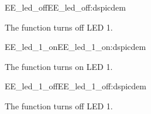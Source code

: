 \begin{function_nopb2}{EE\_led\_off}{EE_led_off:dspicdem}
  
  \begin{fundescription}
    The function turns off LED 1.
  \end{fundescription}
  
  
  
\end{function_nopb2}

\begin{function_nopb2}{EE\_led\_1\_on}{EE_led_1_on:dspicdem}
  
  \begin{fundescription}
    The function turns on LED 1.
  \end{fundescription}
  
  
  
\end{function_nopb2}

\begin{function_nopb2}{EE\_led\_1\_off}{EE_led_1_off:dspicdem}
  
  \begin{fundescription}
    The function turns off LED 1.
  \end{fundescription}
  
  
  
\end{function_nopb2}

